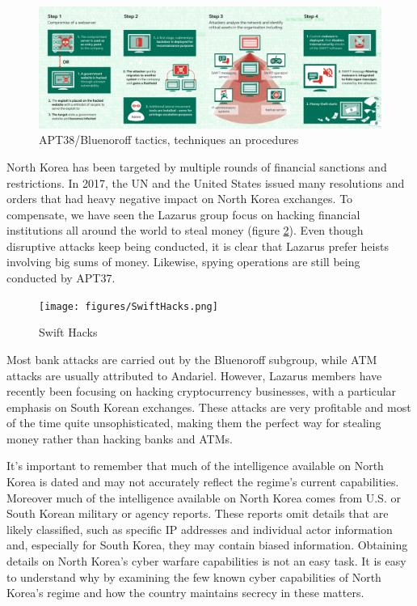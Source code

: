 \documentclass[12pt]{article}
\begin{document}
        \begin{figure}[H]
        \centering
        \includegraphics[width=\textwidth,cfbox=red 0.1mm 0.1mm]{figures/lazarus-tpp.png}
        \caption{APT38/Bluenoroff tactics, techniques an procedures}
        \label{fig:lazarus38}
        \end{figure}

        North Korea has been targeted by multiple rounds of financial sanctions and restrictions. In 2017, the UN and the United States issued many resolutions and orders that had heavy negative impact on North Korea exchanges. 
        To compensate, we have seen the Lazarus group focus on hacking financial institutions all around the world to steal money (figure \ref{fig:SwiftHacks}). Even though disruptive attacks keep being conducted, it is clear that Lazarus prefer heists involving big sums of money. Likewise, spying operations are still being conducted by APT37. 
        
        \begin{figure}[H]
        \centering
        \texttt{[image: figures/SwiftHacks.png]}
        \caption{Swift Hacks}
        \label{fig:SwiftHacks}
        \end{figure}
         
        Most bank attacks are carried out by the Bluenoroff subgroup, while ATM attacks are usually attributed to Andariel. However, Lazarus members have recently been focusing on hacking cryptocurrency businesses, with a particular emphasis on South Korean exchanges. These attacks are very profitable and most of the time quite unsophisticated, making them the perfect way for stealing money rather than hacking banks and ATMs. 
        
        It's important to remember that much of the intelligence available on North Korea is dated and may not accurately reflect the regime’s current capabilities. Moreover much of the intelligence available on North Korea comes from U.S. or South Korean military or agency reports. These reports omit details that are likely classified, such as specific IP addresses and individual actor information and, especially for South Korea, they may contain biased information. Obtaining details on North Korea’s cyber warfare capabilities is not an easy task. It is easy to understand why by examining the few known cyber capabilities of North Korea’s regime and how the country maintains secrecy in these matters. 
        
\end{document}
